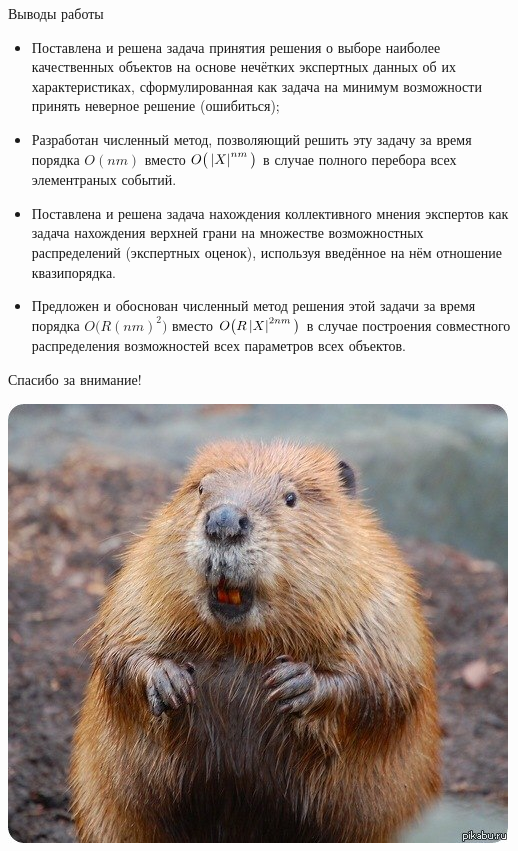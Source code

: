 
\begin{frame}{Выводы работы}
	\begin{itemize}
	 \item 
	 Поставлена и решена задача принятия решения о выборе наиболее качественных объектов на основе нечётких экспертных данных об их характеристиках, сформулированная как задача на минимум возможности принять неверное 
	 решение (ошибиться);	
	\item 
	Разработан численный метод, позволяющий решить эту задачу за время порядка $O(nm)$ вместо $O\big(\left| X \right|^{nm}\big)$ в случае полного перебора всех элементраных событий. %
	\item
	Поставлена и решена задача нахождения коллективного мнения экспертов как задача нахождения верхней грани на множестве возможностных распределений (экспертных оценок), используя введённое на нём отношение квазипорядка.
	\item
	Предложен и обоснован численный метод решения этой задачи за время порядка $O\big(R(nm)^2\big)$ вместо $O\big(R\left| X \right|^{2nm}\big)$ в случае построения совместного распределения возможностей всех параметров всех объектов. %
      \end{itemize}
\end{frame} %

		

\appendix

\begin{frame}{Спасибо за внимание!}
	\begin{center}
		\includegraphics[width=0.5\linewidth]{./pic/biber_final}
	\end{center}
\end{frame}


